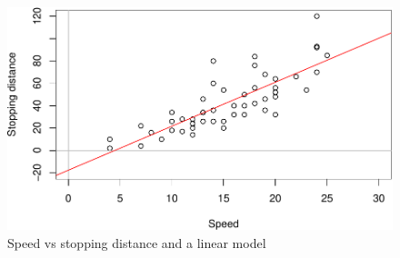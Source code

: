 \documentclass[
]{book}
\theoremstyle{definition}
\theoremstyle{definition}
\theoremstyle{definition}
\theoremstyle{definition}
\theoremstyle{remark}
\begin{document}
\begin{figure}
\centering
\includegraphics{Svetunkov---Statistics-for-Business-Analytics_files/figure-latex/speedDistanceExtrapolation-1.pdf}
\caption{\label{fig:speedDistanceExtrapolation}Speed vs stopping distance and a linear model}
\end{figure}
\end{document}
